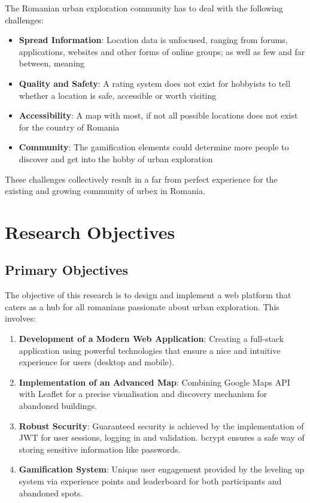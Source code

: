 \documentclass[12pt,a4paper]{report}
\begin{document}
The Romanian urban exploration community has to deal with the following challenges:

\begin{itemize}
    \item \textbf{Spread Information}: Location data is unfocused, ranging from forums, applications, websites and other forms of online groups; as well as few and far between, meaning  
    
    \item \textbf{Quality and Safety}: A rating system does not exist for hobbyists to tell whether a location is safe, accessible or worth visiting
    
    \item \textbf{Accessibility}: A map with most, if not all possible locations does not exist for the country of Romania
    
    \item \textbf{Community}: The gamification elements could determine more people to discover and get into the hobby of urban exploration 
\end{itemize}

These challenges collectively result in a far from perfect experience for the existing and growing community of urbex in Romania.

\section*{Research Objectives}

\subsection*{Primary Objectives}

The objective of this research is to design and implement a web platform that caters as a hub for all romanians passionate about urban exploration. This involves:

\begin{enumerate}
    \item \textbf{Development of a Modern Web Application}: Creating a full-stack application using powerful technologies that ensure a nice and intuitive experience for users (desktop and mobile).
    
    \item \textbf{Implementation of an Advanced Map}: Combining Google Maps API with Leaflet for a precise visualisation and discovery mechanism for abandoned buildings.
    
    \item \textbf{Robust Security}: Guaranteed security is achieved by the implementation of JWT for user sessions, logging in and validation. bcrypt ensures a safe way of storing sensitive information like passwords.
    
    \item \textbf{Gamification System}: Unique user engagement provided by the leveling up system via experience points and leaderboard for both participants and abandoned spots.
\end{enumerate}
\end{document}
